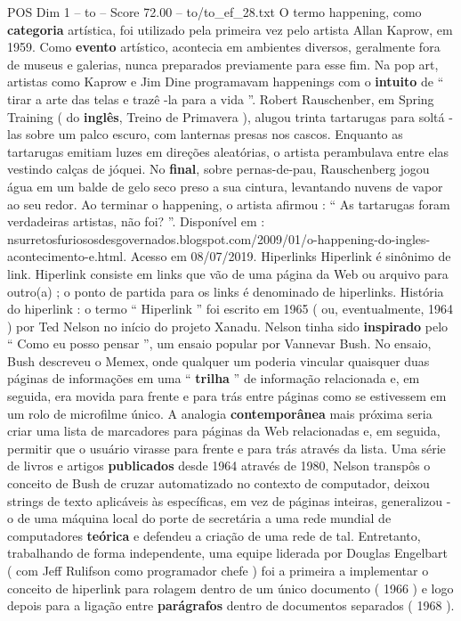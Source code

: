 \begin{textsample}{POS Dim 1 – to – Score 72.00 – to/to\_ef\_28.txt}
O termo happening, como \textbf{categoria} artística, foi utilizado pela primeira vez pelo artista Allan Kaprow, em 1959.
Como \textbf{evento} artístico, acontecia em ambientes diversos, geralmente fora de museus e galerias, nunca preparados previamente para esse fim.
Na pop art, artistas como Kaprow e Jim Dine programavam happenings com o \textbf{intuito} de “ tirar a arte das telas e trazê -la para a vida ”.
Robert Rauschenber, em Spring Training ( do \textbf{inglês}, Treino de Primavera ), alugou trinta tartarugas para soltá -las sobre um palco escuro, com lanternas presas nos cascos.
Enquanto as tartarugas emitiam luzes em direções aleatórias, o artista perambulava entre elas vestindo calças de jóquei.
No \textbf{final}, sobre pernas-de-pau, Rauschenberg jogou água em um balde de gelo seco preso a sua cintura, levantando nuvens de vapor ao seu redor.
Ao terminar o happening, o artista afirmou : “ As tartarugas foram verdadeiras artistas, não foi? ”.
Disponível em : nsurretosfuriososdesgovernados.blogspot.com/2009/01/o-happening-do-ingles-acontecimento-e.html.
Acesso em 08/07/2019.
Hiperlinks Hiperlink é sinônimo de link.
Hiperlink consiste em links que vão de uma página da Web ou arquivo para outro(a) ; o ponto de partida para os links é denominado de hiperlinks.
História do hiperlink : o termo “ Hiperlink ” foi escrito em 1965 ( ou, eventualmente, 1964 ) por Ted Nelson no início do projeto Xanadu.
Nelson tinha sido \textbf{inspirado} pelo “ Como eu posso pensar ”, um ensaio popular por Vannevar Bush.
No ensaio, Bush descreveu o Memex, onde qualquer um poderia vincular quaisquer duas páginas de informações em uma “ \textbf{trilha} ” de informação relacionada e, em seguida, era movida para frente e para trás entre páginas como se estivessem em um rolo de microfilme único.
A analogia \textbf{contemporânea} mais próxima seria criar uma lista de marcadores para páginas da Web relacionadas e, em seguida, permitir que o usuário virasse para frente e para trás através da lista.
Uma série de livros e artigos \textbf{publicados} desde 1964 através de 1980, Nelson transpôs o conceito de Bush de cruzar automatizado no contexto de computador, deixou strings de texto aplicáveis às específicas, em vez de páginas inteiras, generalizou -o de uma máquina local do porte de secretária a uma rede mundial de computadores \textbf{teórica} e defendeu a criação de uma rede de tal.
Entretanto, trabalhando de forma independente, uma equipe liderada por Douglas Engelbart ( com Jeff Rulifson como programador chefe ) foi a primeira a implementar o conceito de hiperlink para rolagem dentro de um único documento ( 1966 ) e logo depois para a ligação entre \textbf{parágrafos} dentro de documentos separados ( 1968 ).

\end{textsample}
